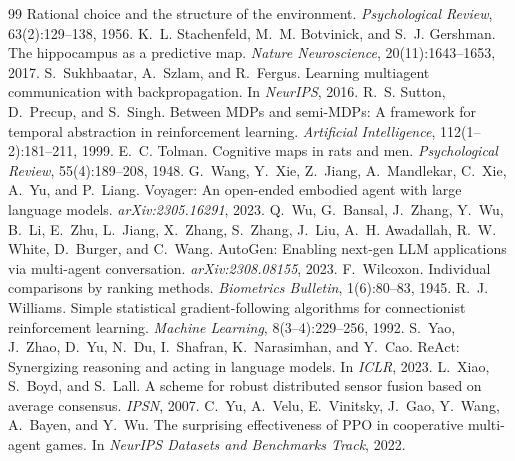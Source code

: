 \documentclass{article}
\begin{document}
\begin{thebibliography}{99}
\newblock Rational choice and the structure of the environment.
\newblock \emph{Psychological Review}, 63(2):129--138, 1956.
K.~L. Stachenfeld, M.~M. Botvinick, and S.~J. Gershman.
\newblock The hippocampus as a predictive map.
\newblock \emph{Nature Neuroscience}, 20(11):1643--1653, 2017.
S.~Sukhbaatar, A.~Szlam, and R.~Fergus.
\newblock Learning multiagent communication with backpropagation.
\newblock In \emph{NeurIPS}, 2016.
R.~S. Sutton, D.~Precup, and S.~Singh.
\newblock Between MDPs and semi-MDPs: A framework for temporal abstraction in reinforcement learning.
\newblock \emph{Artificial Intelligence}, 112(1--2):181--211, 1999.
E.~C. Tolman.
\newblock Cognitive maps in rats and men.
\newblock \emph{Psychological Review}, 55(4):189--208, 1948.
G.~Wang, Y.~Xie, Z.~Jiang, A.~Mandlekar, C.~Xie, A.~Yu, and P.~Liang.
\newblock Voyager: An open-ended embodied agent with large language models.
\newblock \emph{arXiv:2305.16291}, 2023.
Q.~Wu, G.~Bansal, J.~Zhang, Y.~Wu, B.~Li, E.~Zhu, L.~Jiang, X.~Zhang, S.~Zhang, J.~Liu, A.~H. Awadallah, R.~W. White, D.~Burger, and C.~Wang.
\newblock AutoGen: Enabling next-gen LLM applications via multi-agent conversation.
\newblock \emph{arXiv:2308.08155}, 2023.
F.~Wilcoxon.
\newblock Individual comparisons by ranking methods.
\newblock \emph{Biometrics Bulletin}, 1(6):80--83, 1945.
R.~J. Williams.
\newblock Simple statistical gradient-following algorithms for connectionist reinforcement learning.
\newblock \emph{Machine Learning}, 8(3--4):229--256, 1992.
S.~Yao, J.~Zhao, D.~Yu, N.~Du, I.~Shafran, K.~Narasimhan, and Y.~Cao.
\newblock ReAct: Synergizing reasoning and acting in language models.
\newblock In \emph{ICLR}, 2023.
L.~Xiao, S.~Boyd, and S.~Lall.
\newblock A scheme for robust distributed sensor fusion based on average consensus.
\newblock \emph{IPSN}, 2007.
C.~Yu, A.~Velu, E.~Vinitsky, J.~Gao, Y.~Wang, A.~Bayen, and Y.~Wu.
\newblock The surprising effectiveness of PPO in cooperative multi-agent games.
\newblock In \emph{NeurIPS Datasets and Benchmarks Track}, 2022.
\end{thebibliography}
\end{document}

